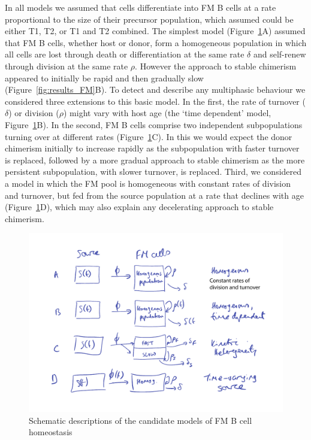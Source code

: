 \documentclass[11pt]{article}
\newcommand{\khi}{Ki67$^\text{hi}$}
\newcommand{\klo}{Ki67$^\text{lo}$}
\begin{document}

	

	
In all models we assumed that cells differentiate into FM B cells at a rate proportional to the size of their precursor population, which assumed could be either T1, T2, or T1 and T2 combined. The simplest model (Figure~\ref{fig:FM-model-sketches}A)  assumed that  FM B cells, whether host or donor, form a homogeneous population in which all cells are lost through death or differentiation  at the same rate $\delta$ and self-renew through division  at the same rate $\rho$. However the approach to stable chimerism appeared to initially be rapid and then gradually slow (Figure~\ref{fig:results_FM}B). To detect and describe any multiphasic behaviour we considered three extensions to this basic model. In the first, the rate of turnover ($\delta$) or division ($\rho$) might vary with host age (the `time dependent' model, Figure~\ref{fig:FM-model-sketches}B). In the second, FM B cells comprise two independent subpopulations turning over at different rates (Figure~\ref{fig:FM-model-sketches}C). In this we would expect the donor chimerism initially to increase rapidly as the subpopulation with faster turnover is replaced, followed by a more gradual approach to stable chimerism as the more persistent subpopulation, with slower turnover, is replaced. Third, we considered a model in which the FM pool is homogeneous with constant rates of division and turnover, but fed from the source population at a rate that declines with age  (Figure~\ref{fig:FM-model-sketches}D), which may also explain any decelerating approach to stable chimerism.  

	\begin{figure}[htbp] %
	   \centering
	   \includegraphics[width=0.8\linewidth]{figures/FM-Model-Sketches.pdf} 
	   \caption{Schematic descriptions of the candidate models of FM B cell homeostasis}
	   \label{fig:FM-model-sketches}
	\end{figure}
	
\end{document}
